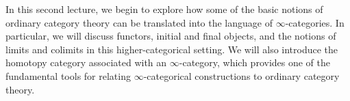 In this second lecture, we begin to explore how some of the basic notions of ordinary category theory can be translated into the language of $\infty$-categories. In particular, we will discuss functors, initial and final objects, and the notions of limits and colimits in this higher-categorical setting. We will also introduce the homotopy category associated with an $\infty$-category, which provides one of the fundamental tools for relating $\infty$-categorical constructions to ordinary category theory.
